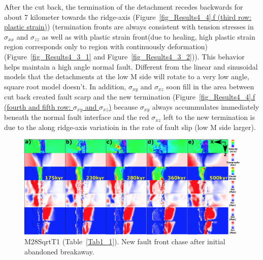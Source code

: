 After the cut back, the termination of the detachment recedes backwards for about 7 kilometer towards the ridge-axis (Figure~\hyperref[fig_Results4_4]{\ref{fig_Results4_4}.f (third row: plastic strain)}) (termination fronts are always consistent with tension stresses in $\sigma_{xx}$ and $\sigma_{zz}$ as well as with plastic strain front(due to healing, high plastic strain region corresponds only to region with continuously deformation) (Figure~\hyperref[fig_Results4_3_1]{\ref{fig_Results4_3_1}} and Figure~\hyperref[fig_Results4_3_2]{\ref{fig_Results4_3_2}})). This behavior helps maintain a high angle normal fault. Different from the linear and sinusoidal models that the detachments at the low M side will rotate to a very low angle, square root model doesn't. In addition, $\sigma_{xy}$ and $\sigma_{xz}$ soon fill in the area between cut back created fault scarp and the new termination (Figure~\hyperref[fig_Results4_4]{\ref{fig_Results4_4}.f (fourth and fifth row: $\sigma_{xy}$ and $\sigma_{xz}$)} because $\sigma_{xy}$ always accummulates immediately beneath the normal fault interface and the red $\sigma_{xz}$ left to the new termination is due to the along ridge-axis variatioin in the rate of fault slip (low M side larger).  

\begin{figure}[h]
  \centering
    \includegraphics[width=1.0\textwidth]{./Figures/fig_Results4_9_sqrt_cut_back_new_fault_chase.eps}
  \caption{M28SqrtT1 (Table~\hyperref[Tab1_1]{\ref{Tab1_1}}). New fault front chase after initial abandoned breakaway.}
 \label{fig_Results4_9}
\end{figure}

